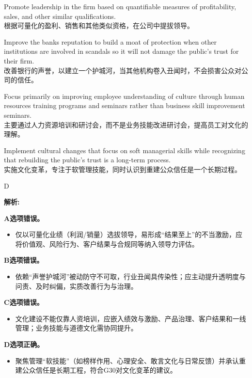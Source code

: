 \documentclass{article}
\newenvironment{explanation}
{\textbf{解析:}\par}
{\par}
\begin{document}
\begin{choices}
    \item Promote leadership in the firm based on quantifiable measures of profitability, sales, and other similar qualifications.\\ 根据可量化的盈利、销售和其他类似资格，在公司中提拔领导。
    \item Improve the banks reputation to build a moat of protection when other institutions are involved in scandals so it will not damage the public's trust for their firm.\\ 改善银行的声誉，以建立一个护城河，当其他机构卷入丑闻时，不会损害公众对公司的信任。
    \item Focus primarily on improving employee understanding of culture through human resources training programs and seminars rather than business skill improvement seminars.\\ 主要通过人力资源培训和研讨会，而不是业务技能改进研讨会，提高员工对文化的理解。
    \item Implement cultural changes that focus on soft managerial skills while recognizing that rebuilding the public's trust is a long-term process.\\ 实施文化变革，专注于软管理技能，同时认识到重建公众信任是一个长期过程。
\end{choices}

\begin{correctanswer}
    D
\end{correctanswer}

\begin{explanation}
    \textbf{A选项错误。}
    \begin{itemize}
        \item 仅以可量化业绩（利润/销量）选拔领导，易形成“结果至上”的不当激励，应将价值观、风险行为、客户结果与合规同等纳入领导力评估。
    \end{itemize}

    \textbf{B选项错误。}
    \begin{itemize}
        \item 依赖“声誉护城河”被动防守不可取，行业丑闻具传染性；应主动提升透明度与问责、及时纠偏，实质改善行为与治理。
    \end{itemize}

    \textbf{C选项错误。}
    \begin{itemize}
        \item 文化建设不能仅靠人资培训，应嵌入绩效与激励、产品治理、客户结果和一线管理；业务技能与道德文化需协同提升。
    \end{itemize}

    \textbf{D选项正确。}
    \begin{itemize}
        \item 聚焦管理“软技能”（如榜样作用、心理安全、敢言文化与日常反馈）并承认重建公众信任是长期工程，符合G30对文化变革的建议。
    \end{itemize}
\end{explanation}
\end{document}
